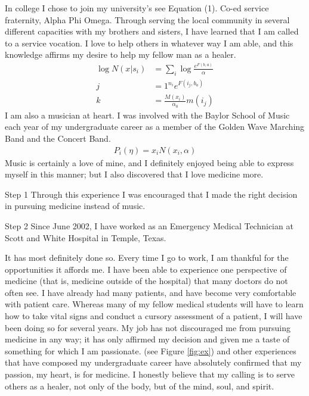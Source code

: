 \documentclass[final]{clv2025}
\begin{document}
In college I chose to join my university's see Equation (1). Co-ed service fraternity, Alpha Phi Omega. Through serving the local community in several different capacities with my brothers and sisters, I have learned that I am called to a service vocation. I love to help others in whatever way I am able, and this knowledge affirms my desire to help my fellow man as a healer.
\begin{align}
\log N(x|s_i)&=\sum_i \log \frac{e^{F(b,a)}}{\alpha}\nonumber
\\
j&=1^{n_i}e^{F(i_j,b_a)}\nonumber
\\
k&=\frac{M(x_i)}{\alpha_0}m(i_j)\nonumber
\end{align}
I am also a musician at heart. I was involved with the Baylor School of Music each year of my undergraduate career as a member of the Golden Wave Marching Band and the Concert Band.
\begin{align}
P_i(\eta)=x_i N(x_i,\alpha)
\end{align}
Music is certainly a love of mine, and I definitely enjoyed being able to express myself
in this manner; but I also discovered that I love medicine more. 
\begin{algorithm}
\item[Step 1] Through this experience I was encouraged that I made the right decision in pursuing medicine instead of music.
\item[Step 2] Since June 2002, I have worked as an Emergency Medical Technician at Scott and White Hospital in Temple, Texas.
\end{algorithm}
It has most definitely done so. Every time I go to work, I am thankful for the opportunities it affords me. I have been able to experience one perspective of medicine (that is, medicine outside of the hospital) that many doctors do not often see. I have already had many patients, and have become very comfortable with patient care. Whereas many of my fellow medical students will have to learn how to take vital signs and conduct a cursory assessment of a patient, I will have been doing so for several years. My job has not discouraged me from pursuing medicine in any way; it has only affirmed my decision and given me a taste of something for which I am passionate. (see Figure \ref{fig:ex}) and other experiences that have composed my undergraduate career have absolutely confirmed that my passion, my heart, is for medicine. I honestly believe that my calling is to serve others as a healer, not only of the body, but of the mind, soul, and spirit.
\end{document}
